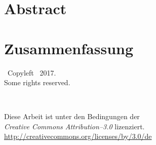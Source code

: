 \newpage

\thispagestyle{empty}
\vspace{4cm}
\section*{Abstract}
\ThesisAbstractEnglish

\vspace{3cm}
\section*{Zusammenfassung}
\ThesisAbstractDeutsch

\newpage

\thispagestyle{empty}
\vspace*{0in}
\begin{center}
	{\Large{}}\ Copyleft \ThesisAuthor~2017. \\
  Some rights reserved. \\
  \vspace{1in}
  \begin{minipage}[c]{0.2\linewidth}
    \hfill {\Huge \ccLogo~\ccAttribution}
  \end{minipage}
  \hspace{0.1cm}
  \begin{minipage}[c]{0.7\linewidth}
    Diese Arbeit ist unter den Bedingungen der \\
    \textit{Creative Commons Attribution--3.0} lizenziert. \\
    \url{http://creativecommons.org/licenses/by/3.0/de}
  \end{minipage}
\end{center}
\vspace{6cm}
\ThesisThanks
\clearpage
